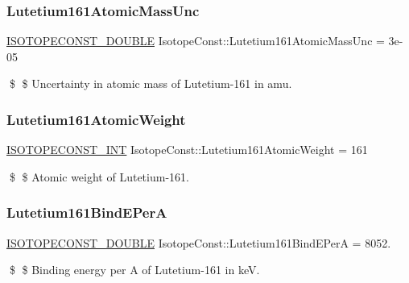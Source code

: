 \subsubsection{\texorpdfstring{Lutetium161\+Atomic\+Mass\+Unc}{Lutetium161AtomicMassUnc}}
{\footnotesize\ttfamily \mbox{\hyperlink{group___isotope_const-_macros_ga8f45a7272ce02c0b4c65c44636ed719a}{I\+S\+O\+T\+O\+P\+E\+C\+O\+N\+S\+T\+\_\+\+D\+O\+U\+B\+LE}} Isotope\+Const\+::\+Lutetium161\+Atomic\+Mass\+Unc = 3e-\/05}

\$ \$ Uncertainty in atomic mass of Lutetium-\/161 in amu. \mbox{\label{group___isotope_const-_lutetium-_lu161_ga09be5c76f2b30b4c4fdc888c1637add6}} 
\subsubsection{\texorpdfstring{Lutetium161\+Atomic\+Weight}{Lutetium161AtomicWeight}}
{\footnotesize\ttfamily \mbox{\hyperlink{group___isotope_const-_macros_ga5f18360b3e99483a35c32d789e62621c}{I\+S\+O\+T\+O\+P\+E\+C\+O\+N\+S\+T\+\_\+\+I\+NT}} Isotope\+Const\+::\+Lutetium161\+Atomic\+Weight = 161}

\$ \$ Atomic weight of Lutetium-\/161. \mbox{\label{group___isotope_const-_lutetium-_lu161_gad76cc612a093c5541ab55009ac12eba5}} 
\subsubsection{\texorpdfstring{Lutetium161\+Bind\+E\+PerA}{Lutetium161BindEPerA}}
{\footnotesize\ttfamily \mbox{\hyperlink{group___isotope_const-_macros_ga8f45a7272ce02c0b4c65c44636ed719a}{I\+S\+O\+T\+O\+P\+E\+C\+O\+N\+S\+T\+\_\+\+D\+O\+U\+B\+LE}} Isotope\+Const\+::\+Lutetium161\+Bind\+E\+PerA = 8052.}

\$ \$ Binding energy per A of Lutetium-\/161 in keV. \mbox{\label{group___isotope_const-_lutetium-_lu161_ga642e77172ed0017f2ded52abcbb1cc3b}} 
